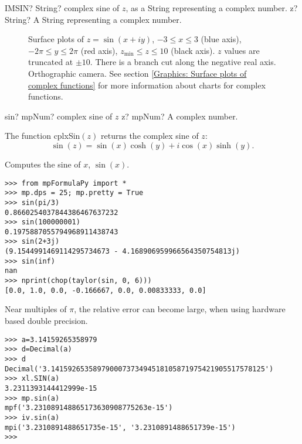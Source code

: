 \vspace{0.6cm}
\begin{mpFunctionsExtract}
	\mpWorksheetFunctionOneNotImplemented
	{IMSIN? String? complex sine of $z$, as a String representing a complex number.}
	{z? String? A String representing a complex number.}
\end{mpFunctionsExtract}


\begin{figure}[ht]%
	\centering
	\qquad
	\caption[Complex Sine]{Surface plots of $z = \sin(x + iy)$, $-3 \leq x \leq 3$ (blue axis), $-2 \pi \leq y \leq 2\pi$ (red axis), $z_{\text{min}} \leq z \leq 10$ (black axis). $z$ values are truncated at $\pm 10$. There is a branch cut along the negative real axis. Orthographic camera. See section \ref{Graphics: Surface plots of complex functions} for more information about charts for complex functions.} 
	\label{fig:Complex Sine}%
\end{figure}


\begin{mpFunctionsExtract}
	\mpFunctionOne
	{sin? mpNum? complex sine of $z$}
	{z? mpNum? A complex number.}
\end{mpFunctionsExtract}

\vspace{0.3cm}
The function \textsf{cplxSin$(z)$} returns the complex sine of $z$: 
\begin{equation}
	\sin(z) = \sin(x) \cosh(y) + i \cos(x) \sinh(y).
\end{equation}


Computes the sine of $x$, $\sin(x)$.
\begin{lstlisting}
>>> from mpFormulaPy import *
>>> mp.dps = 25; mp.pretty = True
>>> sin(pi/3)
0.8660254037844386467637232
>>> sin(100000001)
0.1975887055794968911438743
>>> sin(2+3j)
(9.1544991469114295734673 - 4.168906959966564350754813j)
>>> sin(inf)
nan
>>> nprint(chop(taylor(sin, 0, 6)))
[0.0, 1.0, 0.0, -0.166667, 0.0, 0.00833333, 0.0]
\end{lstlisting}


Near multiples of $\pi$, the relative error can become large, when using hardware based double precision.
\begin{lstlisting}
>>> a=3.14159265358979
>>> d=Decimal(a)
>>> d
Decimal('3.141592653589790007373494518105871975421905517578125')
>>> xl.SIN(a)
3.2311393144412999e-15
>>> mp.sin(a)
mpf('3.231089148865173630908775263e-15')
>>> iv.sin(a)
mpi('3.2310891488651735e-15', '3.2310891488651739e-15')
>>> 
\end{lstlisting}



